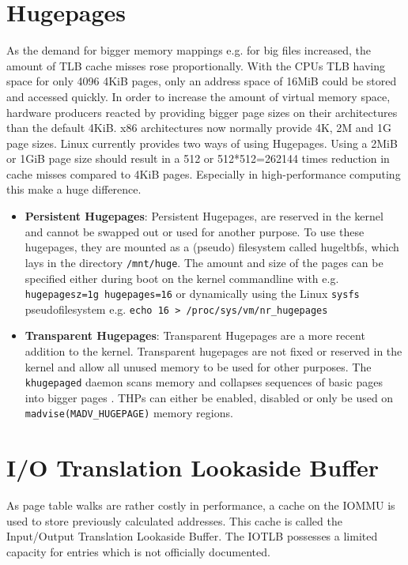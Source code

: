 \section{Hugepages}
As the demand for bigger memory mappings e.g. for big files increased, the amount of TLB cache misses rose proportionally. With the CPUs TLB having space for only 4096 4KiB pages, only an address space of 16MiB could be stored and accessed quickly. In order to increase the amount of virtual memory space, hardware producers reacted by providing bigger page sizes on their architectures than the default 4KiB. x86 architectures now normally provide 4K, 2M and 1G page sizes.
Linux currently provides two ways of using Hugepages.
Using a 2MiB or 1GiB page size should result in a 512 or 512*512=262144 times reduction in cache misses compared to 4KiB pages. Especially in high-performance computing this make a huge difference.

\begin{itemize}
    \item \textbf{Persistent Hugepages}: Persistent Hugepages, are reserved in the kernel and cannot be swapped out or used for another purpose. To use these hugepages, they are mounted as a (pseudo) filesystem called hugeltbfs, which lays in the directory \texttt{/mnt/huge}. \cite{hugetlbkerneldocs} The amount and size of the pages can be specified either during boot on the kernel commandline with e.g. \texttt{hugepagesz=1g hugepages=16} or dynamically using the Linux \texttt{sysfs} pseudofilesystem e.g. \texttt{echo 16 > /proc/sys/vm/nr\_hugepages}
    \item \textbf{Transparent Hugepages}: Transparent Hugepages are a more recent addition to the kernel. Transparent hugepages are not fixed or reserved in the kernel and allow all unused memory to be used for other purposes. The \texttt{khugepaged} daemon scans memory and collapses sequences of basic pages into bigger pages \cite{transhugekerneldocs}. THPs can either be enabled, disabled or only be used on \texttt{madvise(MADV\_HUGEPAGE)} memory regions.
\end{itemize}

\section{I/O Translation Lookaside Buffer}
As page table walks are rather costly in performance, a cache on the IOMMU is used to store previously calculated addresses. This cache is called the Input/Output Translation Lookaside Buffer. The IOTLB possesses a limited capacity for entries which is not officially documented.

